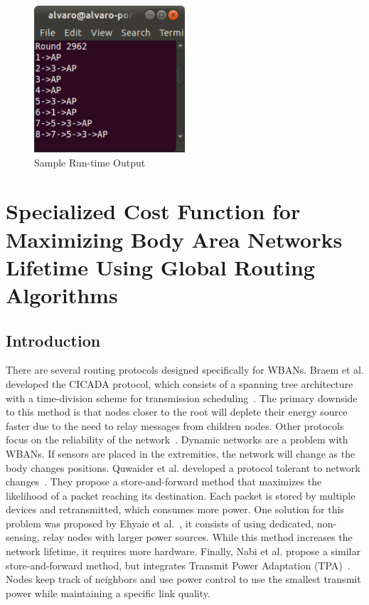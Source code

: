 \documentclass{article}
\begin{document}
\begin{figure}[htb]
\begin{center}
\includegraphics[width=0.5\textwidth]{figures/textoutput.pdf}
\end{center}
\caption{Sample Run-time Output}
\label{fig:textoutput}
\end{figure}



\section{Specialized Cost Function for Maximizing Body Area Networks Lifetime Using Global Routing Algorithms}\label{sec:costfunction}
\subsection{Introduction}

There are several routing protocols designed specifically for WBANs. Braem et al. developed the CICADA protocol, which consists of a spanning tree architecture with a time-division scheme for transmission scheduling~\cite{protocol:CICADA}. The primary downside to this method is that nodes closer to the root will deplete their energy source faster due to the need to relay messages from children nodes. Other protocols focus on the reliability of the network~\cite{routing:storeandforward}. Dynamic networks are a problem with WBANs. If sensors are placed in the extremities, the network will change as the body changes positions. Quwaider et al. developed a protocol tolerant to network changes~\cite{routing:storeandforward}. They propose a store-and-forward method that maximizes the likelihood of a packet reaching its destination. Each packet is stored by multiple devices and retransmitted, which consumes more power. One solution for this problem was proposed by Ehyaie et al.~\cite{relay:networklife}, it consists of using dedicated, non-sensing, relay nodes with larger power sources. While this method increases the network lifetime, it requires more hardware. Finally, Nabi et al. propose a similar store-and-forward method, but integrates Transmit Power Adaptation (TPA)~\cite{relay:transmitpoweradaptation}. Nodes keep track of neighbors and use power control to use the smallest transmit power while maintaining a specific link quality.
\end{document}
